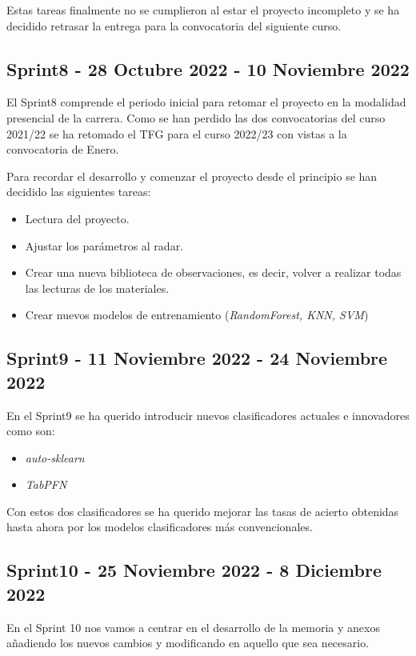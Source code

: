 Estas tareas finalmente no se cumplieron al estar el proyecto incompleto y se ha decidido retrasar la entrega para la convocatoria del siguiente curso.

\subsection{Sprint8 - 28 Octubre 2022 - 10 Noviembre 2022}

El Sprint8 comprende el periodo inicial para retomar el proyecto en la modalidad presencial de la carrera. Como se han perdido las dos convocatorias del curso 2021/22 se ha retomado el TFG para el curso 2022/23 con vistas a la convocatoria de Enero.

Para recordar el desarrollo y comenzar el proyecto desde el principio se han decidido las siguientes tareas:

\begin{itemize}
\item Lectura del proyecto.
\item Ajustar los parámetros al radar.
\item Crear una nueva biblioteca de observaciones, es decir, volver a realizar todas las lecturas de los materiales.
\item Crear nuevos modelos de entrenamiento (\textit{RandomForest, KNN, SVM})
\end{itemize}

\subsection{Sprint9 - 11 Noviembre 2022 - 24 Noviembre 2022}

En el Sprint9 se ha querido introducir nuevos clasificadores actuales e innovadores como son:

\begin{itemize}
\item \textit{auto-sklearn}
\item \textit{TabPFN}
\end{itemize}

Con estos dos clasificadores se ha querido mejorar las tasas de acierto obtenidas hasta ahora por los modelos clasificadores más convencionales.

\subsection{Sprint10 - 25 Noviembre 2022 - 8 Diciembre 2022}

En el Sprint 10 nos vamos a centrar en el desarrollo de la memoria y anexos añadiendo los nuevos cambios y modificando en aquello que sea necesario.


